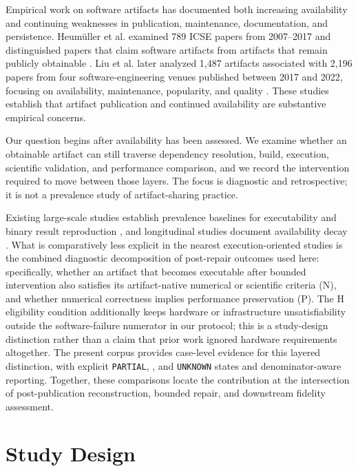\documentclass[a4paper,fleqn]{cas-dc}
\begin{document}
Empirical work on software artifacts has documented both increasing availability and continuing weaknesses in publication, maintenance, documentation, and persistence. Heumüller et al. examined 789 ICSE papers from 2007--2017 and distinguished papers that claim software artifacts from artifacts that remain publicly obtainable \citep{heumueller2020artifacts}. Liu et al. later analyzed 1,487 artifacts associated with 2,196 papers from four software-engineering venues published between 2017 and 2022, focusing on availability, maintenance, popularity, and quality \citep{liu2024artifacttrends}. These studies establish that artifact publication and continued availability are substantive empirical concerns.

Our question begins after availability has been assessed. We examine whether an obtainable artifact can still traverse dependency resolution, build, execution, scientific validation, and performance comparison, and we record the intervention required to move between those layers. The focus is diagnostic and retrospective; it is not a prevalence study of artifact-sharing practice.

Existing large-scale studies establish prevalence baselines for executability and binary result reproduction \citep{muttakin2026openscience,costa2025comprep,samuel2026reproscore}, and longitudinal studies document availability decay \citep{guilloteau2024longevity,heumueller2020artifacts}. What is comparatively less explicit in the nearest execution-oriented studies is the combined diagnostic decomposition of post-repair outcomes used here: specifically, whether an artifact that becomes executable after bounded intervention also satisfies its artifact-native numerical or scientific criteria (N), and whether numerical correctness implies performance preservation (P). The H eligibility condition additionally keeps hardware or infrastructure unsatisfiability outside the software-failure numerator in our protocol; this is a study-design distinction rather than a claim that prior work ignored hardware requirements altogether. The present corpus provides case-level evidence for this layered distinction, with explicit \texttt{PARTIAL}, \protect{}, and \texttt{UNKNOWN} states and denominator-aware reporting. Together, these comparisons locate the contribution at the intersection of post-publication reconstruction, bounded repair, and downstream fidelity assessment.

\section{Study Design}
\end{document}
